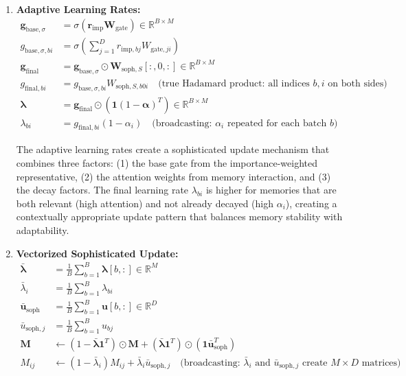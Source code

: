 \documentclass{article}
\begin{document}
\begin{enumerate}
\item \textbf{Adaptive Learning Rates:}
\begin{align}
\mathbf{g}_{\text{base},\sigma} &= \sigma(\mathbf{r}_{\text{imp}} \mathbf{W}_{\text{gate}}) \in \mathbb{R}^{B \times M} \\
g_{\text{base},\sigma,bi} &= \sigma\left(\sum_{j=1}^{D} r_{\text{imp},bj} W_{\text{gate},ji}\right) \\
\mathbf{g}_{\text{final}} &= \mathbf{g}_{\text{base},\sigma} \odot \mathbf{W}_{\text{soph},S}[:, 0, :] \in \mathbb{R}^{B \times M} \\
g_{\text{final},bi} &= g_{\text{base},\sigma,bi} W_{\text{soph},S,b0i} \quad \text{(true Hadamard product: all indices $b,i$ on both sides)} \\
\boldsymbol{\lambda} &= \mathbf{g}_{\text{final}} \odot (\mathbf{1} (1 - \boldsymbol{\alpha})^T) \in \mathbb{R}^{B \times M} \\
\lambda_{bi} &= g_{\text{final},bi} (1 - \alpha_i) \quad \text{(broadcasting: $\alpha_i$ repeated for each batch $b$)}
\end{align}

The adaptive learning rates create a sophisticated update mechanism that combines three factors: (1) the base gate from the importance-weighted representative, (2) the attention weights from memory interaction, and (3) the decay factors. The final learning rate $\lambda_{bi}$ is higher for memories that are both relevant (high attention) and not already decayed (high $\alpha_i$), creating a contextually appropriate update pattern that balances memory stability with adaptability.

\item \textbf{Vectorized Sophisticated Update:}
\begin{align}
\bar{\boldsymbol{\lambda}} &= \frac{1}{B}\sum_{b=1}^{B} \boldsymbol{\lambda}[b, :] \in \mathbb{R}^{M} \\
\bar{\lambda}_i &= \frac{1}{B}\sum_{b=1}^{B} \lambda_{bi} \\
\bar{\mathbf{u}}_{\text{soph}} &= \frac{1}{B}\sum_{b=1}^{B} \mathbf{u}[b, :] \in \mathbb{R}^{D} \\
\bar{u}_{\text{soph},j} &= \frac{1}{B}\sum_{b=1}^{B} u_{bj} \\
\mathbf{M} &\leftarrow (1 - \bar{\boldsymbol{\lambda}} \mathbf{1}^T) \odot \mathbf{M} + (\bar{\boldsymbol{\lambda}} \mathbf{1}^T) \odot (\mathbf{1} \bar{\mathbf{u}}_{\text{soph}}^T) \\
M_{ij} &\leftarrow (1 - \bar{\lambda}_i) M_{ij} + \bar{\lambda}_i \bar{u}_{\text{soph},j} \quad \text{(broadcasting: $\bar{\lambda}_i$ and $\bar{u}_{\text{soph},j}$ create $M \times D$ matrices)}
\end{align}


\end{enumerate}
\end{document}

